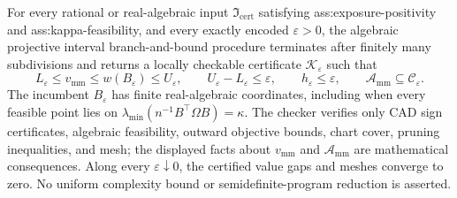 For every rational or real-algebraic input \(\mathfrak I_{\mathrm{cert}}\) satisfying ass:exposure-positivity and ass:kappa-feasibility, and every exactly encoded \(\varepsilon>0\), the algebraic projective interval branch-and-bound procedure terminates after finitely many subdivisions and returns a locally checkable certificate \(\mathscr K_{\varepsilon}\) such that
\[
 L_{\varepsilon}\le v_{\mathrm{mm}}\le w(B_{\varepsilon})\le U_{\varepsilon},
 \qquad U_{\varepsilon}-L_{\varepsilon}\le\varepsilon,
 \qquad h_{\varepsilon}\le\varepsilon,
 \qquad \mathcal A_{\mathrm{mm}}\subseteq\mathcal C_{\varepsilon}.
\]
The incumbent \(B_{\varepsilon}\) has finite real-algebraic coordinates, including when every feasible point lies on \(\lambda_{\min}(n^{-1}B^{\top}\Omega B)=\kappa\).  The checker verifies only CAD sign certificates, algebraic feasibility, outward objective bounds, chart cover, pruning inequalities, and mesh; the displayed facts about \(v_{\mathrm{mm}}\) and \(\mathcal A_{\mathrm{mm}}\) are mathematical consequences.  Along every \(\varepsilon\downarrow0\), the certified value gaps and meshes converge to zero.  No uniform complexity bound or semidefinite-program reduction is asserted.